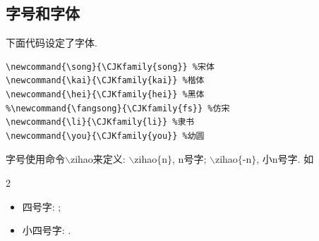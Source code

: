 \documentclass[a4paper,12pt,twoside]{ctexart}
\begin{document}
\vspace*{-10pt}
    \subsection{字号和字体}
    下面代码设定了字体.\vspace*{-10pt}
    \begin{verbatim}
\newcommand{\song}{\CJKfamily{song}} %宋体
\newcommand{\kai}{\CJKfamily{kai}} %楷体
\newcommand{\hei}{\CJKfamily{hei}} %黑体
%\newcommand{\fangsong}{\CJKfamily{fs}} %仿宋
\newcommand{\li}{\CJKfamily{li}} %隶书
\newcommand{\you}{\CJKfamily{you}} %幼圆
    \end{verbatim}\vspace*{0pt}

    \vspace*{-20pt}字号使用命令$\backslash$zihao来定义: $\backslash$zihao$\{$n$\}$, n号字; $\backslash$zihao$\{$-n$\}$, 小n号字.  如
    \begin{multicols}{2}
    \begin{itemize}
    \item 四号字: ;
    \item 小四号字: .
    \end{itemize}
    \end{multicols}
\end{document}
